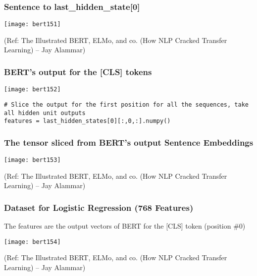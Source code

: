 \begin{frame}[fragile]\frametitle{Sentence to last\_hidden\_state[0]}

			\begin{center}
			\texttt{[image: bert151]}
			\end{center}	

{\tiny (Ref: The Illustrated BERT, ELMo, and co. (How NLP Cracked Transfer Learning) – Jay Alammar)}

\end{frame}


\begin{frame}[fragile]\frametitle{BERT’s output for the [CLS] tokens}



			\begin{center}
			\texttt{[image: bert152]}
			\end{center}	

\begin{lstlisting}
# Slice the output for the first position for all the sequences, take all hidden unit outputs 
features = last_hidden_states[0][:,0,:].numpy()
\end{lstlisting}



\end{frame}


\begin{frame}[fragile]\frametitle{The tensor sliced from BERT's output Sentence Embeddings}


			\begin{center}
			\texttt{[image: bert153]}
			\end{center}	

{\tiny (Ref: The Illustrated BERT, ELMo, and co. (How NLP Cracked Transfer Learning) – Jay Alammar)}

\end{frame}

\begin{frame}[fragile]\frametitle{Dataset for Logistic Regression (768 Features)}

The features are the output vectors of BERT for the [CLS] token (position \#0)

			\begin{center}
			\texttt{[image: bert154]}
			\end{center}	

{\tiny (Ref: The Illustrated BERT, ELMo, and co. (How NLP Cracked Transfer Learning) – Jay Alammar)}

\end{frame}

